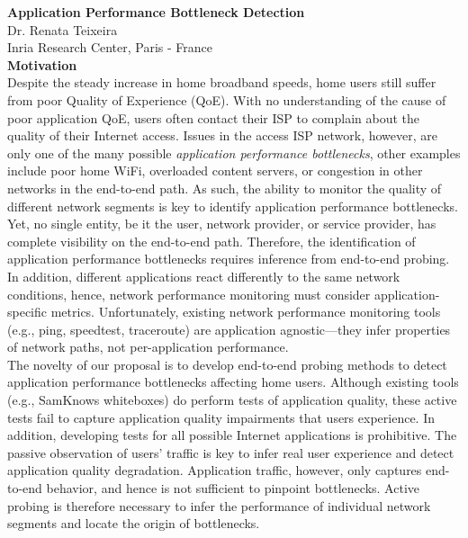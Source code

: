 \documentclass[11 pt]{article}
\begin{document}
\noindent \textbf{Application Performance Bottleneck Detection}\\
Dr. Renata Teixeira \\
Inria Research Center, Paris - France\\

\noindent \textbf{Motivation}\\

Despite the steady increase in home broadband speeds, home users still suffer from poor Quality of Experience (QoE). With no understanding of the cause of poor application QoE, users often contact their ISP to complain about the quality of their Internet access. Issues in the access ISP network, however, are only one of the many possible \textit{application performance bottlenecks}, other examples include poor home WiFi, overloaded  content servers, or congestion in other networks in the end-to-end path.
As such, the ability to monitor the quality of different network segments is key to identify application performance  bottlenecks. Yet, no single entity, be it the user, network provider, or service provider, has complete visibility on the end-to-end path. Therefore, the identification of application performance bottlenecks requires inference from end-to-end probing. In addition, different applications react differently to the same network conditions, hence, network performance monitoring must consider application-specific metrics. Unfortunately, existing network performance monitoring tools (e.g., ping, speedtest, traceroute) are application agnostic---they infer properties of network paths, not per-application performance.\\

The novelty of our proposal is to develop end-to-end probing methods to detect application performance bottlenecks affecting home users. Although existing tools (e.g., SamKnows whiteboxes) do perform tests of application quality, these active tests fail to capture application quality impairments that users experience. In addition, developing tests for all possible Internet applications is prohibitive. The passive observation of users' traffic is key to infer real user experience and detect application quality degradation. Application traffic, however, only captures end-to-end behavior, and hence is not sufficient to pinpoint bottlenecks. Active probing is therefore necessary to infer the performance of individual network segments and locate the origin of bottlenecks.\\
\end{document}
